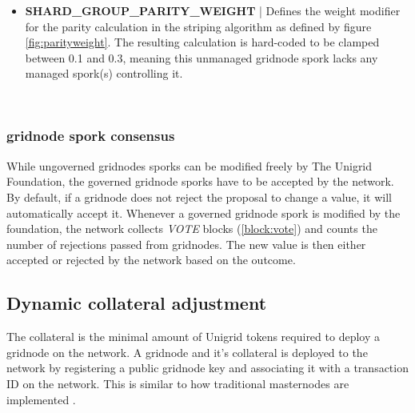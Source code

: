 \documentclass[10pt,a4paper,final]{article}
\newcommand{\colorbitbox}[3]{%
  \rlap{\bitbox{#2}{\color{#1}\rule{\width}{\height}}}%
  \bitbox{#2}{#3}
}
\begin{document}
\begin{itemize}
\medskip
\begin{bytefield}[bitwidth=0.5em]{64}
	 \\
	\colorbitbox{lightgray}{48}{reserved}
\end{bytefield}

If the size is set to a value outside the allowed interval, the value is clamped accordingly to keep it within the required range as defined by the governed \gls{gridnode} spork \emph{SHARD\_GROUP\_SIZE\_INTERVAL}.

\item \textbf{SHARD\_GROUP\_PARITY\_WEIGHT} | Defines the weight modifier for the parity calculation in the striping algorithm as defined by figure \ref{fig:parityweight}. The resulting calculation is hard-coded to be clamped between 0.1 and 0.3, meaning this unmanaged \gls{gridnode} spork lacks any managed spork(s) controlling it.

\medskip
\begin{bytefield}[bitwidth=0.5em]{64}
	 \\
	\colorbitbox{lightgray}{56}{reserved}
\end{bytefield}
\end{itemize}

\subsubsection{\Gls{gridnode} spork consensus}
While ungoverned \glspl{gridnode} sporks can be modified freely by The Unigrid Foundation, the governed \gls{gridnode} sporks have to be accepted by the network. By default, if a \gls{gridnode} does not reject the proposal to change a value, it will automatically accept it. Whenever a governed \gls{gridnode} spork is modified by the foundation, the network collects \emph{VOTE} blocks (\ref{block:vote}) and counts the number of rejections passed from gridnodes. The new value is then either accepted or rejected by the network based on the outcome.

\subsection{Dynamic collateral adjustment}
\label{section:dyncol}
The collateral is the minimal amount of Unigrid tokens required to deploy a \gls{gridnode} on the network. A \gls{gridnode} and it's collateral is deployed to the network by registering a public \gls{gridnode} key and associating it with a transaction ID on the network. This is similar to how traditional masternodes are implemented \cite{darkcoin2014}.
\end{document}
